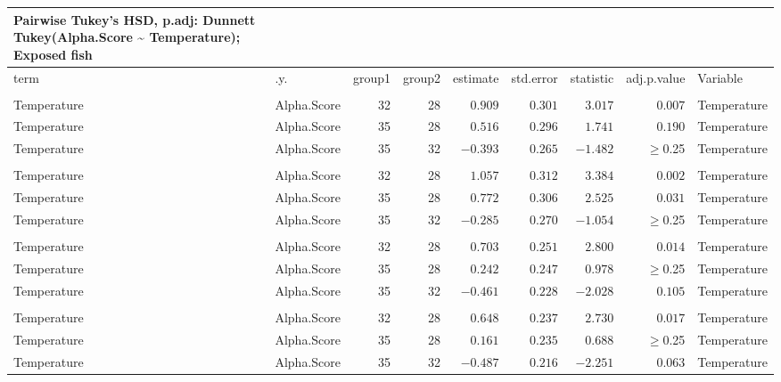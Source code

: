 \documentclass[
]{article}
\begin{document}
\begin{longtable}{llrrrrrrl}
\caption*{
{\large Pairwise Tukey's HSD, p.adj: Dunnett} \\ 
{\small Tukey(Alpha.Score \textasciitilde{} Temperature); Exposed fish}
} \\ 
\toprule
term & .y. & group1 & group2 & estimate & std.error & statistic & adj.p.value & Variable \\ 
\midrule\addlinespace[2.5pt]
\multicolumn{9}{l}{Shannon} \\ 
\midrule\addlinespace[2.5pt]
Temperature & Alpha.Score & 32 & 28 & $0.909$ & $0.301$ & $3.017$ & $0.007$ & Temperature \\ 
Temperature & Alpha.Score & 35 & 28 & $0.516$ & $0.296$ & $1.741$ & $0.190$ & Temperature \\ 
Temperature & Alpha.Score & 35 & 32 & $-0.393$ & $0.265$ & $-1.482$ & $\geq$0.25 & Temperature \\ 
\midrule\addlinespace[2.5pt]
\multicolumn{9}{l}{Simpson} \\ 
\midrule\addlinespace[2.5pt]
Temperature & Alpha.Score & 32 & 28 & $1.057$ & $0.312$ & $3.384$ & $0.002$ & Temperature \\ 
Temperature & Alpha.Score & 35 & 28 & $0.772$ & $0.306$ & $2.525$ & $0.031$ & Temperature \\ 
Temperature & Alpha.Score & 35 & 32 & $-0.285$ & $0.270$ & $-1.054$ & $\geq$0.25 & Temperature \\ 
\midrule\addlinespace[2.5pt]
\multicolumn{9}{l}{Richness} \\ 
\midrule\addlinespace[2.5pt]
Temperature & Alpha.Score & 32 & 28 & $0.703$ & $0.251$ & $2.800$ & $0.014$ & Temperature \\ 
Temperature & Alpha.Score & 35 & 28 & $0.242$ & $0.247$ & $0.978$ & $\geq$0.25 & Temperature \\ 
Temperature & Alpha.Score & 35 & 32 & $-0.461$ & $0.228$ & $-2.028$ & $0.105$ & Temperature \\ 
\midrule\addlinespace[2.5pt]
\multicolumn{9}{l}{Phylogenetic} \\ 
\midrule\addlinespace[2.5pt]
Temperature & Alpha.Score & 32 & 28 & $0.648$ & $0.237$ & $2.730$ & $0.017$ & Temperature \\ 
Temperature & Alpha.Score & 35 & 28 & $0.161$ & $0.235$ & $0.688$ & $\geq$0.25 & Temperature \\ 
Temperature & Alpha.Score & 35 & 32 & $-0.487$ & $0.216$ & $-2.251$ & $0.063$ & Temperature \\ 
\bottomrule
\end{longtable}
\end{document}
